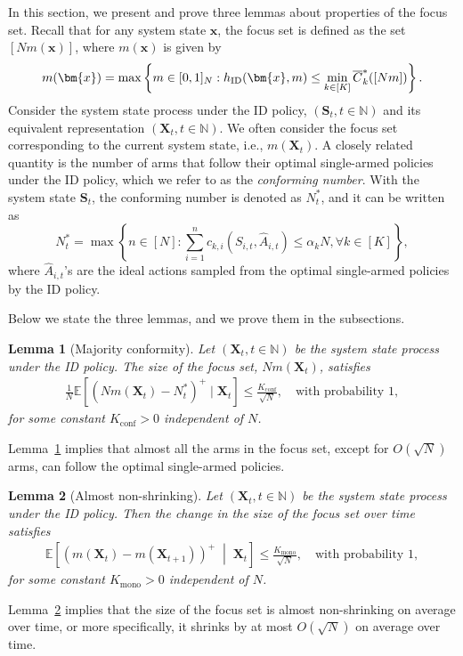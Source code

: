 \documentclass{article}
\theoremstyle{plain}
\newtheorem{lemma}{Lemma}
\theoremstyle{remark}
\newcommand{\givenplain}{\;|\;}
\newcommand{\givenmiddle}{\;\middle|\;}
\newcommand{\mx}{\bm{x}}
\newcommand{\ID}{\textnormal{ID}}
\newcommand{\conf}{\text{conf}}
\newcommand{\mono}{\text{mono}}
\newcommand{\rembud}{\overline{C}^*} %
\def\mX{{\bm{X}}}
\newcommand{\EE}{\mathbb{E}}
\newcommand{\bracket}[1]{\left(#1\right)}
\newcommand{\mbracket}[1]{\left[#1\right]}
\newcommand{\sets}[1]{\left\{ #1 \right\}}
\begin{document}
In this section, we present and prove three lemmas about properties of the focus set.
Recall that for any system state $\mx$, the focus set is defined as the set $[Nm(\mx)]$, where $m(\mx)$ is given by
\begin{align}
    m(\mx)= \max \sets{ m\in[0,1]_N: h_{\ID}(\mx,m)\leq \min_{k\in[K]}\rembud_k([Nm])}.
\end{align}
Consider the system state process under the ID policy, $(\bm{S}_t,t\in\mathbb{N})$ and its equivalent representation $(\mX_t,t\in\mathbb{N})$.
We often consider the focus set corresponding to the current system state, i.e., $m(\mX_t)$.
A closely related quantity is the number of arms that follow their optimal single-armed policies under the ID policy, which we refer to as the \emph{conforming number}.
With the system state $\bm{S}_t$, the conforming number is denoted as $N^*_t$, and it can be written as
\begin{equation}
    N_t^* = \max\sets{n\in[N]\colon \sum_{i=1}^n c_{k,i}(S_{i,t},\widehat{A}_{i,t})\leq \alpha_k N, \forall k\in[K]},
\end{equation}
where $\widehat{A}_{i,t}$'s are the ideal actions sampled from the optimal single-armed policies by the ID policy.


Below we state the three lemmas,  and we prove them in the subsections.

\begin{lemma}[Majority conformity]\label{lem:majority_conformal}
Let $(\mX_t,t\in\mathbb{N})$ be the system state process under the ID policy.
The size of the focus set, $Nm(\mX_t)$, satisfies
\begin{align*}
    \frac{1}{N}\EE[\bracket{Nm(\mX_t) - N_t^* }^+ \givenplain \mX_t]\leq \frac{K_{\conf}}{\sqrt{N}}, \quad\text{with probability }1,
\end{align*}
for some constant $K_{\conf}>0$ independent of $N$.
\end{lemma}
Lemma~\ref{lem:majority_conformal} implies that almost all the arms in the focus set, except for $O(\sqrt{N})$ arms, can follow the optimal single-armed policies.

\begin{lemma}[Almost non-shrinking]\label{lem:non-shrinking}
Let $(\mX_t,t\in\mathbb{N})$ be the system state process under the ID policy.
Then the change in the size of the focus set over time satisfies
    \begin{align*}
    \EE\mbracket{(m(\mX_t)-m(\mX_{t+1}))^+ \givenmiddle \mX_t} \leq  \frac{K_{\mono}}{\sqrt{N}},\quad\text{with probability }1,
\end{align*}
for some constant $K_{\mono}>0$ independent of $N$.
\end{lemma}
Lemma~\ref{lem:non-shrinking} implies that the size of the focus set is almost non-shrinking on average over time, or more specifically, it shrinks by at most $O(\sqrt{N})$ on average over time.
\end{document}
